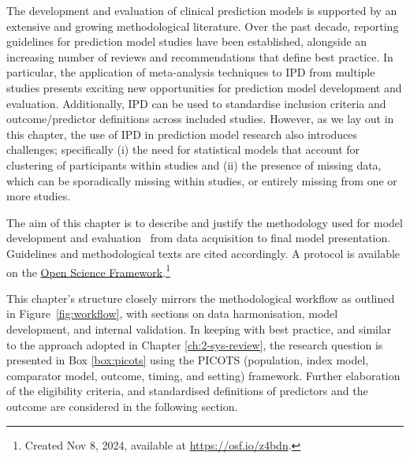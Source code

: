 The development and evaluation of clinical prediction models is supported by an extensive and growing methodological literature. Over the past decade, reporting guidelines for prediction model studies have been established\cite{collins2015, moons2015, debray2023, collins2024A}, alongside an increasing number of reviews and recommendations that define best practice\cite{efthimiou2024, collins2024B, riley2024A, riley2024B, vanSmeden2021}. In particular, the application of meta-analysis techniques to IPD from multiple studies presents exciting new opportunities for prediction model development and evaluation\cite{riley2021_book_ch17, debray2023}.  Additionally, IPD can be used to standardise inclusion criteria and outcome/predictor definitions across included studies. However, as we lay out in this chapter, the use of IPD in prediction model research also introduces challenges; specifically (i) the need for statistical models that account for clustering of participants within studies and (ii) the presence of missing data, which can be sporadically missing within studies, or entirely missing from one or more studies\cite{debray2023}.

The aim of this chapter is to describe and justify the methodology used for model development and evaluation \textemdash\ from data acquisition to final model presentation. Guidelines and methodological texts are cited accordingly\cite{collins2024A,debray2023}. A protocol is available on the \href{https://osf.io/z4bdn}{Open Science Framework}.\footnote{Created Nov 8, 2024, available at \url{https://osf.io/z4bdn}.}

This chapter's structure closely mirrors the methodological workflow as outlined in Figure~\ref{fig:workflow}, with sections on data harmonisation, model development, and internal validation. In keeping with best practice, and similar to the approach adopted in Chapter \ref{ch:2-sys-review}, the research question is presented in Box \ref{box:picots} using the PICOTS (population, index model, comparator model, outcome, timing, and setting) framework\cite{riley2021_book_ch17, debray2017}. Further elaboration of the eligibility criteria, and standardised definitions of predictors and the outcome are considered in the following section.

